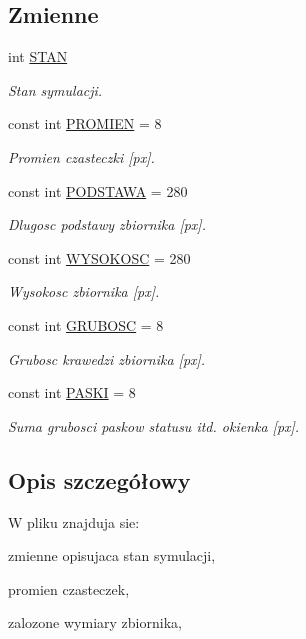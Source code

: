\subsection*{Zmienne}
\begin{DoxyCompactItemize}
\item 
int \hyperlink{flagi_8hh_ae3a120c63186a17e4127a68187b3e9e8}{S\-T\-A\-N}
\begin{DoxyCompactList}\small\item\em Stan symulacji. \end{DoxyCompactList}\item 
const int \hyperlink{flagi_8hh_aa77f856f3142a9e81752665a9bc2e6de}{P\-R\-O\-M\-I\-E\-N} = 8
\begin{DoxyCompactList}\small\item\em Promien czasteczki \mbox{[}px\mbox{]}. \end{DoxyCompactList}\item 
const int \hyperlink{flagi_8hh_acd3c5814c051e565bf7854f6403acf49}{P\-O\-D\-S\-T\-A\-W\-A} = 280
\begin{DoxyCompactList}\small\item\em Dlugosc podstawy zbiornika \mbox{[}px\mbox{]}. \end{DoxyCompactList}\item 
const int \hyperlink{flagi_8hh_a073767f0ac7dbf009a42b00de1092b52}{W\-Y\-S\-O\-K\-O\-S\-C} = 280
\begin{DoxyCompactList}\small\item\em Wysokosc zbiornika \mbox{[}px\mbox{]}. \end{DoxyCompactList}\item 
const int \hyperlink{flagi_8hh_a359a95636f17b8e9b7a01389d75b521d}{G\-R\-U\-B\-O\-S\-C} = 8
\begin{DoxyCompactList}\small\item\em Grubosc krawedzi zbiornika \mbox{[}px\mbox{]}. \end{DoxyCompactList}\item 
const int \hyperlink{flagi_8hh_afa380d01dc08ee237b4eea9046704397}{P\-A\-S\-K\-I} = 8
\begin{DoxyCompactList}\small\item\em Suma grubosci paskow statusu itd. okienka \mbox{[}px\mbox{]}. \end{DoxyCompactList}\end{DoxyCompactItemize}


\subsection{Opis szczegółowy}
W pliku znajduja sie\-:
\begin{DoxyItemize}
\item zmienne opisujaca stan symulacji,
\item promien czasteczek,
\item zalozone wymiary zbiornika, 
\end{DoxyItemize}

